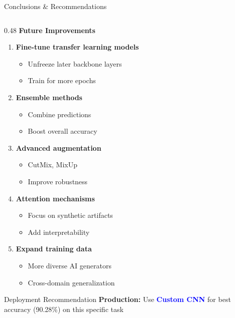 \documentclass[aspectratio=169]{beamer}
\begin{document}
\begin{frame}{Conclusions \& Recommendations}
\begin{columns}[T]
        \begin{column}{0.48\textwidth}
            \textbf{Future Improvements}
            \begin{enumerate}
                \scriptsize
                \item \textbf{Fine-tune transfer learning models}
                    \begin{itemize}
                        \scriptsize
                        \item Unfreeze later backbone layers
                        \item Train for more epochs
                    \end{itemize}
                \item \textbf{Ensemble methods}
                    \begin{itemize}
                        \scriptsize
                        \item Combine predictions
                        \item Boost overall accuracy
                    \end{itemize}
                \item \textbf{Advanced augmentation}
                    \begin{itemize}
                        \scriptsize
                        \item CutMix, MixUp
                        \item Improve robustness
                    \end{itemize}
                \item \textbf{Attention mechanisms}
                    \begin{itemize}
                        \scriptsize
                        \item Focus on synthetic artifacts
                        \item Add interpretability
                    \end{itemize}
                \item \textbf{Expand training data}
                    \begin{itemize}
                        \scriptsize
                        \item More diverse AI generators
                        \item Cross-domain generalization
                    \end{itemize}
            \end{enumerate}
            
            \vspace{0.3cm}
            \begin{block}{Deployment Recommendation}
                \textbf{Production:} Use \textcolor{blue}{\textbf{Custom CNN}} for best accuracy (90.28\%) on this specific task
            \end{block}
        \end{column}
    \end{columns}
\end{frame}
\end{document}
